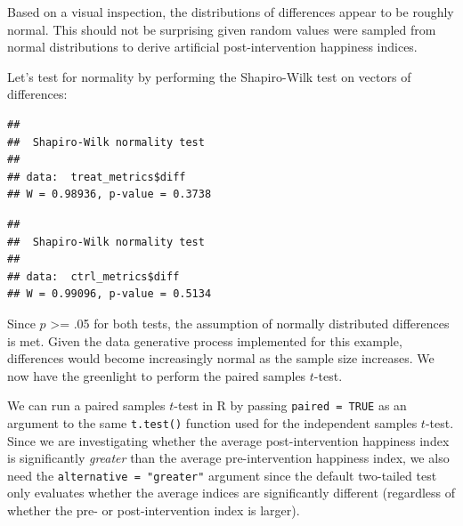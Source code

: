 \documentclass[
]{book}
\newenvironment{Shaded}{\begin{snugshade}}{\end{snugshade}}
\newcommand{\CommentTok}[1]{\textcolor[rgb]{0.56,0.35,0.01}{\textit{#1}}}
\newcommand{\FunctionTok}[1]{\textcolor[rgb]{0.00,0.00,0.00}{#1}}
\newcommand{\NormalTok}[1]{#1}
\newcommand{\SpecialCharTok}[1]{\textcolor[rgb]{0.00,0.00,0.00}{#1}}
\begin{document}
Based on a visual inspection, the distributions of differences appear to be roughly normal. This should not be surprising given random values were sampled from normal distributions to derive artificial post-intervention happiness indices.

Let's test for normality by performing the Shapiro-Wilk test on vectors of differences:

\begin{Shaded}
\end{Shaded}

\begin{verbatim}
## 
##  Shapiro-Wilk normality test
## 
## data:  treat_metrics$diff
## W = 0.98936, p-value = 0.3738
\end{verbatim}

\begin{Shaded}
\end{Shaded}

\begin{verbatim}
## 
##  Shapiro-Wilk normality test
## 
## data:  ctrl_metrics$diff
## W = 0.99096, p-value = 0.5134
\end{verbatim}

Since \(p\) \textgreater= .05 for both tests, the assumption of normally distributed differences is met. Given the data generative process implemented for this example, differences would become increasingly normal as the sample size increases. We now have the greenlight to perform the paired samples \(t\)-test.

We can run a paired samples \(t\)-test in R by passing \texttt{paired\ =\ TRUE} as an argument to the same \texttt{t.test()} function used for the independent samples \(t\)-test. Since we are investigating whether the average post-intervention happiness index is significantly \emph{greater} than the average pre-intervention happiness index, we also need the \texttt{alternative\ =\ "greater"} argument since the default two-tailed test only evaluates whether the average indices are significantly different (regardless of whether the pre- or post-intervention index is larger).
\end{document}
